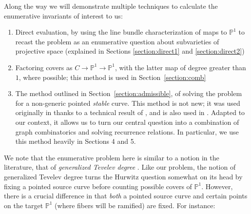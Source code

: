 \documentclass[thesis]{thesis-umich}           %
\renewcommand{\P}{\mathbb P}
\theoremstyle{definition}
\begin{document}
Along the way we will demonstrate multiple techniques to calculate the enumerative
invariants of interest to us:
\begin{enumerate}
\item Direct evaluation, by using the line bundle characterization of maps to $\P^1$ to recast the problem as an enumerative question about subvarieties of projective space (explained in Sections \ref{section:direct1} and \ref{section:direct2})
\item Factoring covers as $C\to\P^1\to\P^1$, with the latter map of degree greater than $1$, where possible; this method is used in Section~\ref{section:comb}
  \item The method outlined in Section~\ref{section:admissible}, of solving the problem for a non-generic pointed {\it stable} curve. This method is not new; it was used originally in \cite{Cela} thanks to a technical result of \cite{Lian}, and is also used in \cite{Generalized}. Adapted to our context, it allows us to turn our central question into a combination of graph combinatorics and solving recurrence relations. In particular, we use this method heavily in Sections 4 and 5.
  \end{enumerate}

We note that the enumerative problem here is similar to a notion in the literature,
that of {\it generalized Tevelev degree} \cite{Generalized}. Like our problem, the notion
of generalized Tevelev degree turns the Hurwitz question somewhat on its head by fixing
a pointed source curve before counting possible covers of $\P^1$. However, there is a crucial difference
in that {\it both} a pointed source curve and certain points on the target $\P^1$ (where fibers will be ramified) are fixed. For instance:
\end{document}
